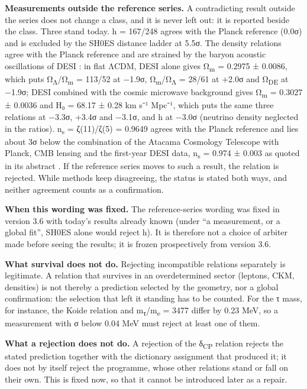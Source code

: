 \documentclass[11pt,a4paper]{article}
\begin{document}
\textbf{Measurements outside the reference series.} A contradicting result outside the series does not change a class, and it is never left out: it is reported beside the class. Three stand today. h = 167/248 agrees with the Planck reference (0.0σ) and is excluded by the SH0ES distance ladder \cite{4} at 5.5σ. The density relations agree with the Planck reference and are strained by the baryon acoustic oscillations of DESI \cite{61}: in flat ΛCDM, DESI alone gives Ω\textsubscript{m} = 0.2975 ± 0.0086, which puts Ω\textsubscript{Λ}/Ω\textsubscript{m} = 113/52 at −1.9σ, Ω\textsubscript{m}/Ω\textsubscript{Λ} = 28/61 at +2.0σ and Ω\textsubscript{DE} at −1.9σ; DESI combined with the cosmic microwave background gives Ω\textsubscript{m} = 0.3027 ± 0.0036 and H₀ = 68.17 ± 0.28 km s⁻¹ Mpc⁻¹, which puts the same three relations at −3.3σ, +3.4σ and −3.1σ, and h at −3.0σ (neutrino density neglected in the ratios). n\textsubscript{s} = ζ(11)/ζ(5) = 0.9649 agrees with the Planck reference and lies about 3σ below the combination of the Atacama Cosmology Telescope with Planck, CMB lensing and the first-year DESI data, n\textsubscript{s} = 0.974 ± 0.003 as quoted in its abstract \cite{62}. If the reference series moves to such a result, the relation is rejected. While methods keep disagreeing, the status is stated both ways, and neither agreement counts as a confirmation.

\textbf{When this wording was fixed.} The reference-series wording was fixed in version 3.6 with today's results already known (under ``a measurement, or a global fit'', SH0ES alone would reject h). It is therefore not a choice of arbiter made before seeing the results; it is frozen prospectively from version 3.6.

\textbf{What survival does not do.} Rejecting incompatible relations separately is legitimate. A relation that survives in an overdetermined sector (leptons, CKM, densities) is not thereby a prediction selected by the geometry, nor a global confirmation: the selection that left it standing has to be counted. For the τ mass, for instance, the Koide relation and m\textsubscript{τ}/m\textsubscript{e} = 3477 differ by 0.23 MeV, so a measurement with σ below 0.04 MeV must reject at least one of them.

\textbf{What a rejection does not do.} A rejection of the δ\textsubscript{CP} relation rejects the stated prediction together with the dictionary assignment that produced it; it does not by itself reject the programme, whose other relations stand or fall on their own. This is fixed now, so that it cannot be introduced later as a repair.
\end{document}

